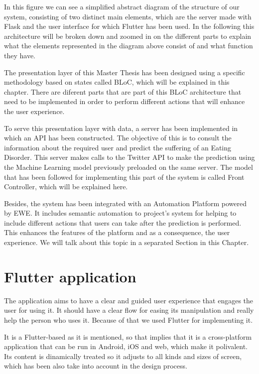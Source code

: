 In this figure we can see a simplified abstract diagram of the structure of our system, consisting of two distinct main elements, which are the server made with Flask and the user interface for which Flutter has been used. In the following this architecture will be broken down and zoomed in on the different parts to explain what the elements represented in the diagram above consist of and what function they have.

The presentation layer of this Master Thesis has been designed using a specific methodology based on states called BLoC, which will be explained in this chapter. There are diferent parts that are part of this BLoC architecture that need to be implemented in order to perform different actions that will enhance the user experience.

To serve this presentation layer with data, a server has been implemented in which an API has been constructed. The objective of this is to consult the information about the required user and predict the suffering of an Eating Disorder. This server makes calls to the Twitter API to make the prediction using the Machine Learning model previously preloaded on the same server. The model that has been followed for implementing this part of the system is called Front Controller, which will be explained here.

Besides, the system has been integrated with an Automation Platform powered by EWE. It includes semantic automation to project's system for helping to include different actions that users can take after the prediction is performed. This enhances the features of the platform and as a consequence, the user experience. We will talk about this topic in a separated Section in this Chapter.

\section{Flutter application}
The application aims to have a clear and guided user experience that engages the user for using it. It should have a clear flow for easing its manipulation and really help the person who uses it. Because of that we used Flutter for implementing it.

It is a Flutter-based as it is mentioned, so that implies that it is a cross-platform application that can be run in Android, iOS and web, which make it polivalent. Its content is dinamically treated so it adjusts to all kinds and sizes of screen, which has been also take into account in the design process.

